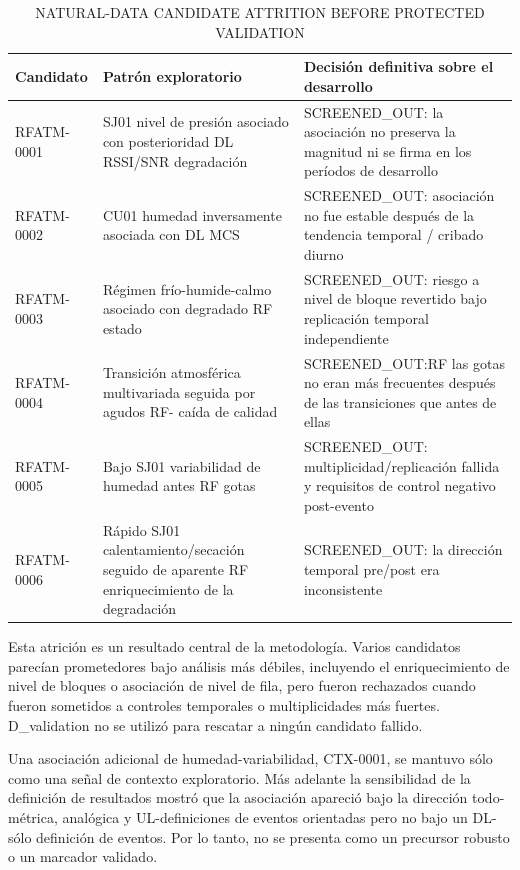 \documentclass{ieeeaccess}
\begin{document}
\begin{table}[t]
\caption{NATURAL-DATA CANDIDATE ATTRITION BEFORE PROTECTED VALIDATION}
\label{tab:iii}
\centering
\scriptsize
\setlength{\tabcolsep}{3pt}
\renewcommand{\arraystretch}{1.15}
\begin{tabularx}{\textwidth}{>{\raggedright\arraybackslash}X >{\raggedright\arraybackslash}X >{\raggedright\arraybackslash}X}
\toprule
Candidato & Patrón exploratorio & Decisión definitiva sobre el desarrollo \\
\midrule
RFATM-0001 & SJ01 nivel de presión asociado con posterioridad DL RSSI/SNR degradación & SCREENED\_OUT: la asociación no preserva la magnitud ni se firma en los períodos de desarrollo \\
RFATM-0002 & CU01 humedad inversamente asociada con DL MCS & SCREENED\_OUT: asociación no fue estable después de la tendencia temporal / cribado diurno \\
RFATM-0003 & Régimen frío-humide-calmo asociado con degradado RF estado & SCREENED\_OUT: riesgo a nivel de bloque revertido bajo replicación temporal independiente \\
RFATM-0004 & Transición atmosférica multivariada seguida por agudos RF- caída de calidad & SCREENED\_OUT:RF las gotas no eran más frecuentes después de las transiciones que antes de ellas \\
RFATM-0005 & Bajo SJ01 variabilidad de humedad antes RF gotas & SCREENED\_OUT: multiplicidad/replicación fallida y requisitos de control negativo post-evento \\
RFATM-0006 & Rápido SJ01 calentamiento/secación seguido de aparente RF enriquecimiento de la degradación & SCREENED\_OUT: la dirección temporal pre/post era inconsistente \\
\bottomrule
\end{tabularx}
\end{table}

Esta atrición es un resultado central de la metodología. Varios candidatos parecían prometedores bajo análisis más débiles, incluyendo el enriquecimiento de nivel de bloques o asociación de nivel de fila, pero fueron rechazados cuando fueron sometidos a controles temporales o multiplicidades más fuertes. D\_validation no se utilizó para rescatar a ningún candidato fallido.

Una asociación adicional de humedad-variabilidad, CTX-0001, se mantuvo sólo como una señal de contexto exploratorio. Más adelante la sensibilidad de la definición de resultados mostró que la asociación apareció bajo la dirección todo-métrica, analógica y UL-definiciones de eventos orientadas pero no bajo un DL-sólo definición de eventos. Por lo tanto, no se presenta como un precursor robusto o un marcador validado.
\end{document}
